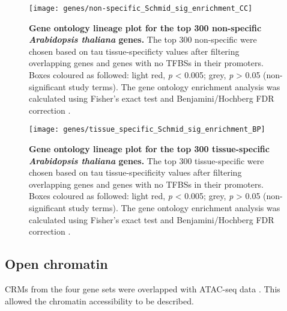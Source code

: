 \documentclass[../main.tex]{subfiles}
\begin{document}
\begin{figure}[hbt!]
	\begin{center}
		\capstart
		\texttt{[image: genes/non-specific\_Schmid\_sig\_enrichment\_CC]}
		\caption{
			\textbf{Gene ontology lineage plot for the top 300 non\hyp{}specific \textit{Arabidopsis thaliana} genes.}
			The top 300 non\hyp{}specific were chosen based on tau tissue\hyp{}specificty values after filtering overlapping genes and genes with no TFBSs in their promoters.
			Boxes coloured as followed: light red, \textit{p} \textless{} 0.005; grey, \textit{p} \textgreater{} 0.05 (non-significant study terms).
			The gene ontology enrichment analysis was calculated using Fisher's exact test \autocite{fisherInterpretationContingencyTables1922} and Benjamini/Hochberg FDR correction \autocite{benjaminiControllingFalseDiscovery1995}.
			\label{fig:go-variable}
		}
		
	\end{center}
\end{figure}

\begin{figure}[hbt!]
	\begin{center}
		\capstart
		\texttt{[image: genes/tissue\_specific\_Schmid\_sig\_enrichment\_BP]}
		\caption{
			\textbf{Gene ontology lineage plot for the top 300 tissue\hyp{}specific \textit{Arabidopsis thaliana} genes.}
			The top 300 tissue\hyp{}specific were chosen based on tau tissue\hyp{}specificity values after filtering overlapping genes and genes with no TFBSs in their promoters.
			Boxes coloured as followed: light red, \textit{p} \textless{} 0.005; grey, \textit{p} \textgreater{} 0.05 (non-significant study terms).
			The gene ontology enrichment analysis was calculated using Fisher's exact test \autocite{fisherInterpretationContingencyTables1922} and Benjamini/Hochberg FDR correction \autocite{benjaminiControllingFalseDiscovery1995}.
			\label{fig:go-variable}
		}
		
	\end{center}
\end{figure}



\subsection{Open chromatin}
CRMs from the four gene sets were overlapped with ATAC-seq data \autocite{potterCytokininModulatesContextdependent2018}. This allowed the chromatin accessibility to be described.
\end{document}

